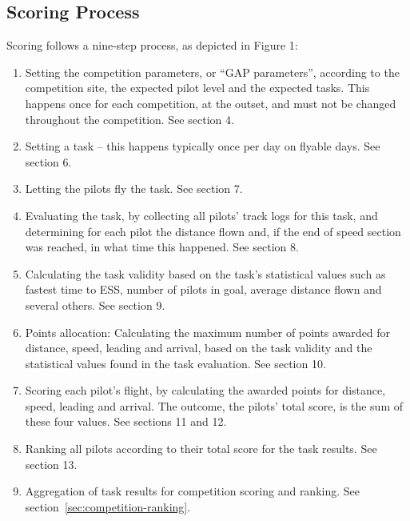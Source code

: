 \documentclass{article}
\begin{document}
\subsection{Scoring Process}
Scoring follows a nine-step process, as depicted in Figure 1:
\begin{enumerate}
    \item
        Setting the competition parameters, or “GAP parameters”, according to
        the competition site, the expected pilot level and the expected tasks.
        This happens once for each competition, at the outset, and must not be
        changed throughout the competition. See section 4.
    \item
        Setting a task – this happens typically once per day on flyable days.
        See section 6.
    \item
        Letting the pilots fly the task. See section 7.
    \item
        Evaluating the task, by collecting all pilots’ track logs for this
        task, and determining for each pilot the distance flown and, if the end
        of speed section was reached, in what time this happened. See section
        8.
    \item
        Calculating the task validity based on the task’s statistical values
        such as fastest time to ESS, number of pilots in goal, average distance
        flown and several others. See section 9.
    \item
        Points allocation: Calculating the maximum number of points awarded for
        distance, speed, leading and arrival, based on the task validity and
        the statistical values found in the task evaluation. See section 10.
    \item
        Scoring each pilot’s flight, by calculating the awarded points for
        distance, speed, leading and arrival. The outcome, the pilots’ total
        score, is the sum of these four values. See sections 11 and 12.
    \item
        Ranking all pilots according to their total score for the task results.
        See section 13.
    \item
        Aggregation of task results for competition scoring and ranking. See
        section~\ref{sec:competition-ranking}.
\end{enumerate}
\end{document}
